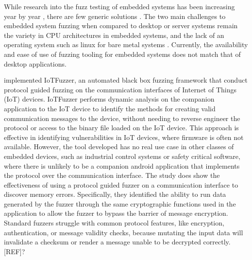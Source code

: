 \documentclass[../report.tex]{subfiles}
\begin{document}

While research into the fuzz testing of embedded systems has been increasing
year by year \citep{Yun_2022}, there are few generic solutions
\citep{Eisele_et_al_2022}. The two main challenges to embedded system fuzzing
when compared to desktop or server systems remain the variety in CPU
architectures in embedded systems, and the lack of an operating system such as
linux for bare metal systems \citep{Eisele_et_al_2022}. Currently, the
availability and ease of use of fuzzing tooling for embedded systems does not
match that of desktop applications.

\citet{IOTFuzzer_2018} implemented IoTFuzzer, an automated black box fuzzing
framework that conduct protocol guided fuzzing on the communication interfaces
of Internet of Things (IoT) devices. IoTFuzzer performs dynamic analysis on the companion
application to the IoT device to identify the methods for creating valid
communication messages to the device, without needing to reverse engineer the
protocol or access to the binary file loaded on the IoT device. This approach
is effective in identifying vulnerabilities in IoT devices, where firmware is
often not available. However, the tool developed has no real use case in other
classes of embedded devices, such as industrial control systems or safety
critical software, where there is unlikely to be a companion android
application that implements the protocol over the communication interface.
The study does show the effectiveness of using a protocol guided
fuzzer on a communication interface to discover memory errors. Specifically,
they identified the ability to run data generated by the fuzzer through the same
cryptographic functions used in the application to allow the fuzzer to bypass
the barrier of message encryption. Standard fuzzers struggle with common
protocol features, like encryption, authentication, or message validity checks,
because mutating the input data will invalidate a checksum or render a message
unable to be decrypted correctly. [REF]?
\end{document}
